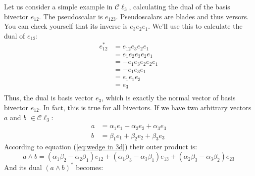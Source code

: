 \documentclass[10pt]{report}
\begin{document}
Let us consider a simple example in $\mathcal{C}\ell_3$,
calculating the dual of the basis bivector $e_{12}$. The
pseudoscalar is $e_{123}$. Pseudoscalars are blades and thus
versors. You can check yourself that its inverse is $e_3e_2e_1$.
We'll use this to calculate the dual of $e_{12}$:
\begin{align}
    e_{12}^* &= e_{12}e_3e_2e_1     \nonumber\\
             &= e_1e_2e_3e_2e_1     \nonumber\\
             &= -e_1e_3e_2e_2e_1    \nonumber\\
             &= -e_1e_3e_1          \nonumber\\
             &= e_1e_1e_3           \nonumber\\
             &= e_3                 \nonumber\\
\end{align}
Thus, the dual is basis vector $e_3$, which is exactly the normal
vector of basis bivector $e_{12}$. In fact, this is true for all
bivectors. If we have two arbitrary vectors $a$ and $b$ $\in
\mathcal{C}\ell_3$:
\begin{align}
    a &= \alpha_1e_1 + \alpha_2e_2 + \alpha_3e_3   \nonumber\\
    b &= \beta_1e_1 + \beta_2e_2 + \beta_3e_3      \nonumber
\end{align}
According to equation (\ref{eq:wedge in 3d}) their outer product
is:
\begin{displaymath}
    a\wedge b = (\alpha_{1}\beta_{2} - \alpha_{2}\beta_{1})e_{12} +
                (\alpha_{1}\beta_{3} - \alpha_{3}\beta_{1})e_{13} +
                (\alpha_{2}\beta_{3} - \alpha_{3}\beta_{2})e_{23}
\end{displaymath}
And its dual $(a\wedge b)^*$ becomes:
\end{document}
